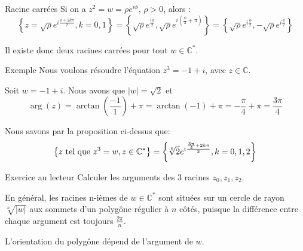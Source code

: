 \documentclass[a4paper]{article}
\begin{document}
\begin{parag}{Racine carrées}
    Si on a $z^{2} = w = \rho e^{i\phi}$, $\rho > 0$, alors :
    \[\left\{z = \sqrt{\rho} e^{i \frac{\phi + 2k\pi}{2}}, k = 0, 1\right\} = \left\{\sqrt{\rho} e^{\frac{i\phi}{2}}, \sqrt{\rho}e^{i\left(\frac{\phi}{2} + \pi\right)}\right\} = \left\{\sqrt{\rho}e^{i \frac{\phi}{2}}, -\sqrt{\rho}e^{i \frac{\phi}{2}}\right\}\]

    Il existe donc deux racines carrées pour tout $w \in \mathbb{C}^*$.
\end{parag}

\begin{parag}{Exemple}
    Nous voulons résoudre l'équation $z^3 = -1 + i$, avec $z \in \mathbb{C}$.

    Soit $w = -1 + i$. Nous avons que $\left|w\right| = \sqrt{2}$ et
    \[\arg\left(z\right) = \arctan\left(\frac{-1}{1}\right) + \pi = \arctan\left(-1\right) + \pi = -\frac{\pi}{4} + \pi = \frac{3\pi}{4}\]

    Nous savons par la proposition ci-dessus que:
    \[\left\{z \telque z^3 = w, z \in \mathbb{C}^*\right\} = \left\{\sqrt[6]{2} e^{i \frac{\frac{3\pi}{4} + 2k\pi}{3}}, k = 0, 1, 2\right\}\]


    \begin{subparag}{Exercice au lecteur}
        Calculer les arguments des 3 racines $z_0, z_1, z_2$.
    \end{subparag}

    En général, les racines n-ièmes de $w \in \mathbb{C}^*$ sont situées sur un cercle de rayon $\sqrt[n]{\left|w\right|}$ aux sommets d'un polygône régulier à $n$ côtés, puisque la différence entre chaque argument est toujours $\frac{2\pi}{n}$.

    L'orientation du polygône dépend de l'argument de $w$.
\end{parag}
\end{document}
